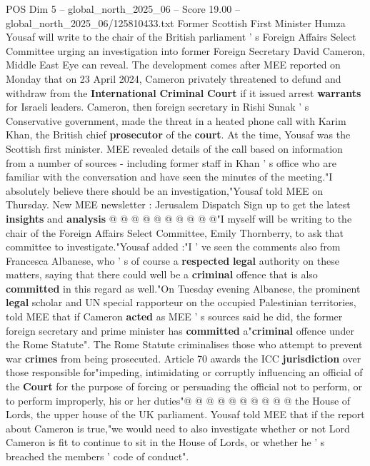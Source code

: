 \begin{textsample}{POS Dim 5 – global\_north\_2025\_06 – Score 19.00 – global\_north\_2025\_06/125810433.txt}  \label{ex:f5_pos_067}
Former Scottish First Minister Humza Yousaf will write to the chair of the British parliament ' s Foreign Affairs Select Committee urging an investigation into former Foreign Secretary David Cameron, Middle East Eye can reveal.
The development comes after MEE reported on Monday that on 23 April 2024, Cameron privately threatened to defund and withdraw from the \textbf{International} \textbf{Criminal} \textbf{Court} if it issued arrest \textbf{warrants} for Israeli leaders.
Cameron, then foreign secretary in Rishi Sunak ' s Conservative government, made the threat in a heated phone call with Karim Khan, the British chief \textbf{prosecutor} of the \textbf{court}.
At the time, Yousaf was the Scottish first minister.
MEE revealed details of the call based on information from a number of sources - including former staff in Khan ' s office who are familiar with the conversation and have seen the minutes of the meeting."I absolutely believe there should be an investigation,"Yousaf told MEE on Thursday.
New MEE newsletter : Jerusalem Dispatch Sign up to get the latest \textbf{insights} and \textbf{analysis} @ @ @ @ @ @ @ @ @ @"I myself will be writing to the chair of the Foreign Affairs Select Committee, Emily Thornberry, to ask that committee to investigate."Yousaf added :"I ' ve seen the comments also from Francesca Albanese, who ' s of course a \textbf{respected} \textbf{legal} authority on these matters, saying that there could well be a \textbf{criminal} offence that is also \textbf{committed} in this regard as well."On Tuesday evening Albanese, the prominent \textbf{legal} scholar and UN special rapporteur on the occupied Palestinian territories, told MEE that if Cameron \textbf{acted} as MEE ' s sources said he did, the former foreign secretary and prime minister has \textbf{committed} a"\textbf{criminal} offence under the Rome Statute".
The Rome Statute criminalises those who attempt to prevent war \textbf{crimes} from being prosecuted.
Article 70 awards the ICC \textbf{jurisdiction} over those responsible for"impeding, intimidating or corruptly influencing an official of the \textbf{Court} for the purpose of forcing or persuading the official not to perform, or to perform improperly, his or her duties"@ @ @ @ @ @ @ @ @ @ the House of Lords, the upper house of the UK parliament.
Yousaf told MEE that if the report about Cameron is true,"we would need to also investigate whether or not Lord Cameron is fit to continue to sit in the House of Lords, or whether he ' s breached the members ' code of conduct".

\end{textsample}

